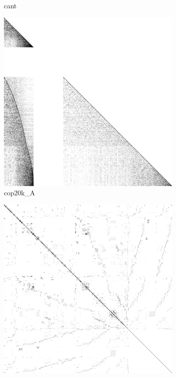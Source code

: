 \begin{figure}
\begin{multicols}{3}
\begin{subfigure}{\linewidth}
\caption{cant}
\end{subfigure}
\end{multicols}
\begin{multicols}{3}
\begin{subfigure}{\linewidth}
\includegraphics[width=\linewidth]{images/cop20k_A}
\caption{cop20k\_A}
\end{subfigure}
\begin{subfigure}{\linewidth}
\includegraphics[width=\linewidth]{images/scircuit}

\end{subfigure}
\end{multicols}
\end{figure}
